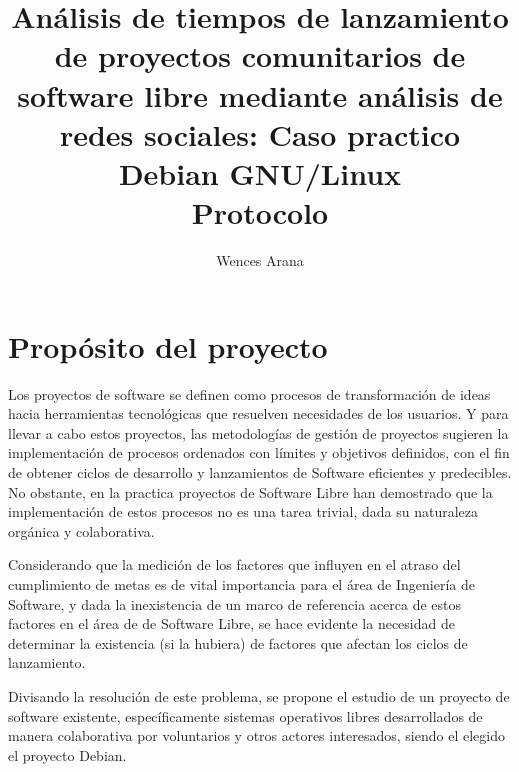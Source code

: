 \documentclass[12pt,titlepage]{report}
\begin{document}
 \title{ {Análisis de tiempos de lanzamiento de
    proyectos comunitarios de software libre mediante análisis de
    redes sociales: Caso practico Debian GNU/Linux} \\ {Protocolo} }
\author{Wences Arana}
\maketitle

\tableofcontents
\renewcommand{\chaptername}{}%
\renewcommand{\thechapter}{}%

\setcounter{section}{0} \cleardoublepage

\chapter{Propósito del proyecto}

Los proyectos de software se definen como procesos de transformación
de ideas hacia herramientas tecnológicas que resuelven necesidades de
los usuarios. Y para llevar a cabo estos proyectos, las metodologías
de gestión de proyectos sugieren la implementación de procesos
ordenados con límites y objetivos definidos, con el fin de obtener
ciclos de desarrollo y lanzamientos de Software eficientes y
predecibles.  No obstante, en la practica proyectos de Software Libre
han demostrado que la implementación de estos procesos no es una tarea
trivial, dada su naturaleza orgánica y colaborativa.

Considerando que la medición de los factores que
influyen en el atraso del cumplimiento de metas es de vital
importancia para el área de Ingeniería de Software, y dada la
inexistencia de un marco de referencia acerca de estos factores en el
área de de Software Libre, se hace evidente la necesidad de determinar
la existencia (si la hubiera) de factores que afectan los ciclos de
lanzamiento.

Divisando la resolución de este problema, se propone el estudio de un
proyecto de software existente, específicamente sistemas operativos
libres desarrollados de manera colaborativa por voluntarios y otros
actores interesados, siendo el elegido el proyecto Debian.
\end{document}
